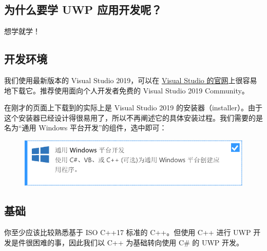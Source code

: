 \subsection{为什么要学 UWP 应用开发呢？}

想学就学！

\subsection{开发环境}

我们使用最新版本的 Visual Studio 2019，可以在 \href{https://visualstudio.microsoft.com/zh-hans/vs/}{Visual Studio 的官网}上很容易地下载它。推荐使用面向个人开发者免费的 Visual Studio 2019 Community。

在刚才的页面上下载到的实际上是 Visual Studio 2019 的安装器（installer）。由于这个安装器已经设计得很易用了，所以不再阐述它的具体安装过程。我们需要的是名为``通用 Windows 平台开发''的组件，选中即可：

\begin{figure}[htbp]
    \centering
    \includegraphics[width = 0.5\paperwidth]{pic/1.png}
\end{figure}

\subsection{基础}

你至少应该比较熟悉基于 ISO C++17 标准的 C++。但使用 C++ 进行 UWP 开发是件很困难的事，因此我们以 C++ 为基础转向使用 C\# 的 UWP 开发。